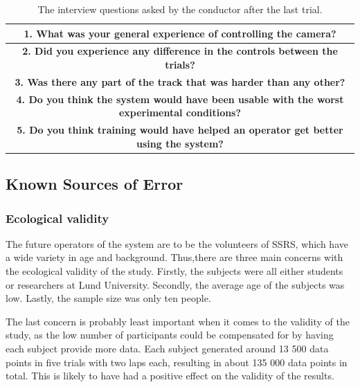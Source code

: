 \documentclass[nofilelist]{cslthse-msc}
\begin{document}
\setlength{\extrarowheight}{5pt}
\vspace{10pt}

\begin{table}[!hbt]
   \centering
      \begin{tabular}{|c|}
         \hline
         \textbf{1. What was your general experience of controlling the camera?} \\
         \hline
         \textbf{2. Did you experience any difference in the controls between the trials?} \\
         \hline
         \textbf{3. Was there any part of the track that was harder than any other?} \\
         \hline
         \textbf{4. Do you think the system would have been usable with the worst experimental conditions?} \\
         \hline
         \textbf{5. Do you think training would have helped an operator get better using the system?} \\
         \hline
      \end{tabular}
   \caption{The interview questions asked by the conductor after the last trial.}
   \label{tab:interview-questions}
\end{table}

\vspace{10pt}

\subsection{Known Sources of Error}

\subsubsection{Ecological validity}
The future operators of the system are to be the volunteers of SSRS, which have a wide variety in age and background. Thus,there are three main concerns with the ecological validity of the study. Firstly, the subjects were all either students or researchers at Lund University. Secondly, the average age of the subjects was low. Lastly, the sample size was only ten people. 

The last concern is probably least important when it comes to the validity of the study, as the low number of participants could be compensated for by having each subject provide more data. Each subject generated around 13 500 data points in five trials with two laps each, resulting in about 135 000 data points in total. This is likely to have had a positive effect on the validity of the results.
\end{document}
